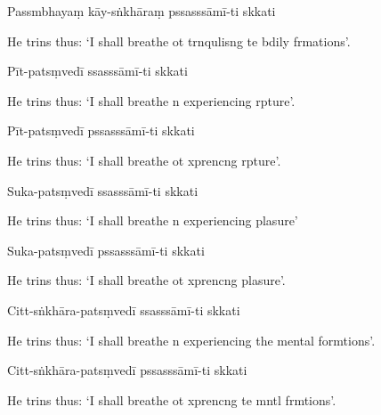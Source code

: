 Passmbhayaṃ kāy-sṅkhāraṃ pssasssāmī-ti skkati

\begin{english}
  He trins thus: `I shall breathe ot trnqulisng te bdily frmations'.
\end{english}

Pīt-patsṃvedī ssasssāmī-ti skkati

\begin{english}
  He trins thus: `I shall breathe n experiencing rpture'.
\end{english}

Pīt-patsṃvedī pssasssāmī-ti skkati

\begin{english}
  He trins thus: `I shall breathe ot xprencng rpture'.
\end{english}

Suka-patsṃvedī ssasssāmī-ti skkati

\begin{english}
  He trins thus: `I shall breathe n experiencing plasure'
\end{english}

Suka-patsṃvedī pssasssāmī-ti skkati

\begin{english}
  He trins thus: `I shall breathe ot xprencng plasure'.
\end{english}

Citt-sṅkhāra-patsṃvedī ssasssāmī-ti skkati

\begin{english}
  He trins thus: `I shall breathe n experiencing the mental formtions'.
\end{english}

Citt-sṅkhāra-patsṃvedī pssasssāmī-ti skkati

\begin{english}
  He trins thus: `I shall breathe ot xprencng te mntl frmtions'.
\end{english}

